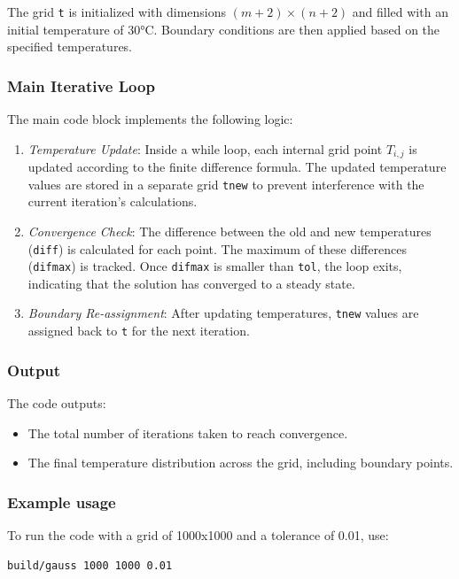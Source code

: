 \documentclass[11pt,a4paper]{article}
\begin{document}
The grid \texttt{t} is initialized with dimensions
\((m+2) \times (n+2)\) and filled with an initial temperature of 30°C.
Boundary conditions are then applied based on the specified temperatures.

\subsubsection{Main Iterative Loop}

The main code block implements the following logic:
\begin{enumerate}
  \item
        \emph{Temperature Update}:
        Inside a while loop,
        each internal grid point \(T_{i,j}\)
        is updated according to the finite difference formula.
        The updated temperature values are stored in a separate grid
        \texttt{tnew} to prevent interference
        with the current iteration's calculations.
  \item
        \emph{Convergence Check}:
        The difference between the old and new
        temperatures (\texttt{diff}) is calculated for each point.
        The maximum of these differences (\texttt{difmax}) is tracked.
        Once \texttt{difmax} is smaller than \texttt{tol},
        the loop exits,
        indicating that the solution has converged to a steady state.
  \item
        \emph{Boundary Re-assignment}:
        After updating temperatures,
        \texttt{tnew} values are assigned
        back to \texttt{t} for the next iteration.
\end{enumerate}

\subsubsection{Output}

The code outputs: 
\begin{itemize}
  \item 
  The total number of iterations taken to reach
  convergence. 
  \item 
  The final temperature distribution across the grid,
  including boundary points.
\end{itemize}

\subsubsection{Example usage}

To run the code with a grid of 1000x1000 and a tolerance of 0.01, use:
\begin{verbatim}
build/gauss 1000 1000 0.01
\end{verbatim}
\end{document}
